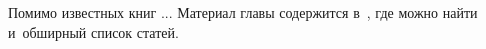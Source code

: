 \vspace{8mm}
\hfill\begin{minipage}[b]{0.95\linewidth}
\fontsize{10}{12}\selectfont

\section*{\wordforbibliography}

\begin{otherlanguage}{russian}

Помимо известных книг ... Материал главы содержится в~\cite{eliseev-models}, где можно найти и~обширный список статей.

\end{otherlanguage}

\end{minipage}

